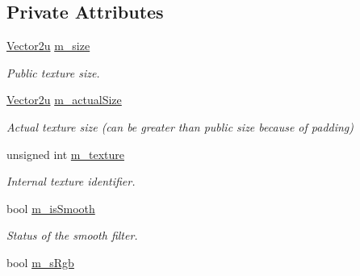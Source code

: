 \subsection*{Private Attributes}
\begin{DoxyCompactItemize}
\item 
\mbox{\label{classsf_1_1_texture_ac3331492797999500ef1961f3615ca39}} 
\mbox{\hyperlink{classsf_1_1_vector2}{Vector2u}} \mbox{\hyperlink{classsf_1_1_texture_ac3331492797999500ef1961f3615ca39}{m\+\_\+size}}
\begin{DoxyCompactList}\small\item\em Public texture size. \end{DoxyCompactList}\item 
\mbox{\label{classsf_1_1_texture_a089c91e048d30eb1ae05e53e31b23604}} 
\mbox{\hyperlink{classsf_1_1_vector2}{Vector2u}} \mbox{\hyperlink{classsf_1_1_texture_a089c91e048d30eb1ae05e53e31b23604}{m\+\_\+actual\+Size}}
\begin{DoxyCompactList}\small\item\em Actual texture size (can be greater than public size because of padding) \end{DoxyCompactList}\item 
\mbox{\label{classsf_1_1_texture_ac24541fe89e9dead5ec37c8b6a1a1a41}} 
unsigned int \mbox{\hyperlink{classsf_1_1_texture_ac24541fe89e9dead5ec37c8b6a1a1a41}{m\+\_\+texture}}
\begin{DoxyCompactList}\small\item\em Internal texture identifier. \end{DoxyCompactList}\item 
\mbox{\label{classsf_1_1_texture_a95c7a25c8b3e93af39eafc4a6f7d302b}} 
bool \mbox{\hyperlink{classsf_1_1_texture_a95c7a25c8b3e93af39eafc4a6f7d302b}{m\+\_\+is\+Smooth}}
\begin{DoxyCompactList}\small\item\em Status of the smooth filter. \end{DoxyCompactList}\item 
\mbox{\label{classsf_1_1_texture_a48d64c3935177f56ae78889f1c29c1c3}} 
bool \mbox{\hyperlink{classsf_1_1_texture_a48d64c3935177f56ae78889f1c29c1c3}{m\+\_\+s\+Rgb}}

\end{DoxyCompactItemize}
